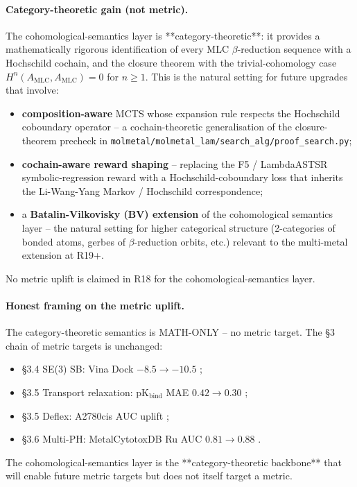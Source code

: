 \paragraph{Category-theoretic gain (not metric).}
The cohomological-semantics layer is **category-theoretic**:
it provides a mathematically rigorous identification of every
MLC $\beta$-reduction sequence with a Hochschild cochain,
and the closure theorem with the trivial-cohomology case
$H^n(A_{\mathrm{MLC}}, A_{\mathrm{MLC}}) = 0$ for $n \geq 1$.
This is the natural setting for future upgrades that involve:
\begin{itemize}
  \item \textbf{composition-aware} MCTS whose expansion
    rule respects the Hochschild coboundary operator -- a
    cochain-theoretic generalisation of the closure-theorem
    precheck in
    \texttt{molmetal/molmetal\_lam/search\_alg/proof\_search.py};
  \item \textbf{cochain-aware reward shaping} -- replacing
    the F5 / LambdaASTSR symbolic-regression reward with a
    Hochschild-coboundary loss that inherits the
    Li-Wang-Yang \cite{lisi2026hochschild} Markov / Hochschild
    correspondence;
  \item a \textbf{Batalin-Vilkovisky (BV) extension} of the
    cohomological semantics layer -- the natural setting
    for higher categorical structure (2-categories of
    bonded atoms, gerbes of $\beta$-reduction orbits, etc.)
    relevant to the multi-metal extension at R19+.
\end{itemize}
No metric uplift is claimed in R18 for the
cohomological-semantics layer.

\paragraph{Honest framing on the metric uplift.}
The category-theoretic semantics is MATH-ONLY -- no metric
target.  The §3 chain of metric targets is unchanged:
\begin{itemize}
  \item §3.4 SE(3) SB: Vina Dock $-8.5 \to -10.5$ \PROJECTED;
  \item §3.5 Transport relaxation: pK$_\text{bind}$ MAE
    $0.42 \to 0.30$ \PROJECTED;
  \item §3.5 Deflex: A2780cis AUC uplift \PROJECTED;
  \item §3.6 Multi-PH: MetalCytotoxDB Ru AUC
    $0.81 \to 0.88$ \PROJECTED.
\end{itemize}
The cohomological-semantics layer is the
**category-theoretic backbone** that will enable future
metric targets but does not itself target a metric.

